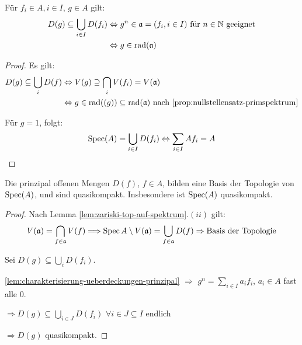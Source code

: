 \begin{lem}
\label{lem:charakterisierung-ueberdeckungen-prinzipal}
Für $f_{i} \in A, i\in I$, $g\in A$ gilt:
  \begin{align*}
    D(g)\subseteq\bigcup_{i\in I}D(f_{i})
    & \Leftrightarrow g^{n}\in\mathfrak{a}=(f_{i},i\in I)\text{ für }n \in \mathbb{N} \text{ geeignet}\\
    & \Leftrightarrow g\in\operatorname{rad}(\mathfrak{a})
  \end{align*}
\end{lem}
\begin{proof} Es gilt:
  \begin{align*}
    D(g)\subseteq\bigcup_{i}D(f)
    & \Leftrightarrow V(g)\supseteq\bigcap_{i} V(f_{i})=V(\mathfrak{a})\\
    & \Leftrightarrow g\in\operatorname{rad}((g))\subseteq\operatorname{rad}(\mathfrak{a}) \text{ nach } \ref{prop:nullstellensatz-primspektrum}
  \end{align*}

  Für $g=1$, folgt:
  \[ \operatorname{Spec}(A)=\bigcup_{i\in I}D(f_{i})\Leftrightarrow\sum_{i\in
      I}Af_{i}=A
  \]
\end{proof}
\begin{prop}
\label{prop:prinzipal-offene-bilden-basis}
Die prinzipal offenen Mengen $D(f)$, $f\in A$, bilden
  eine Basis der Topologie von $\operatorname{Spec}(A)$, und sind
  quasikompakt. Insbesondere ist $\operatorname{Spec}(A)$ quasikompakt.
\end{prop}
\begin{proof} Nach Lemma \ref{lem:zariski-top-auf-spektrum}$.(ii)$ gilt:
  \[
    V(\mathfrak{a})=\bigcap_{f \in\mathfrak{a}}V(f)\Longrightarrow\operatorname{Spec} A\setminus
    V(\mathfrak{a})=\bigcup_{f\in\mathfrak{a}}D(f)\Rightarrow\text{Basis
      der Topologie}
  \]

  Sei $D(g)\subseteq\bigcup_{i}D(f_{i})$.

  \ref{lem:charakterisierung-ueberdeckungen-prinzipal} $\Rightarrow$ $g^{n}=\sum_{i\in I}a_{i}f_{i}$, $a_{i}\in A$
  fast alle 0.

  $\Rightarrow D(g)\subseteq\bigcup_{i\in J}D(f_{i})$ $\forall i\in J\subseteq I$ endlich

  $\Rightarrow D(g)$ quasikompakt.
\end{proof}
